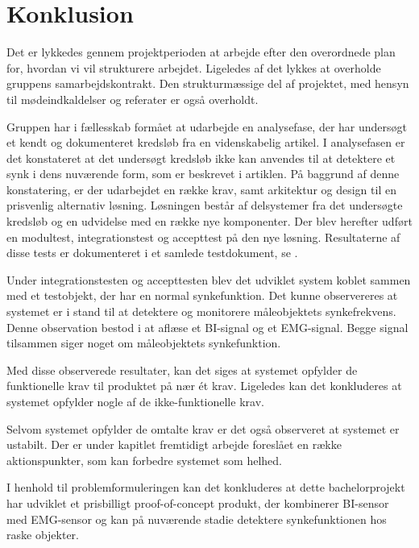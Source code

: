 \chapter{Konklusion}

Det er lykkedes gennem projektperioden at arbejde efter den overordnede plan for, hvordan vi vil strukturere arbejdet.  Ligeledes af det lykkes at overholde gruppens samarbejdskontrakt. Den strukturmæssige del af projektet, med hensyn til mødeindkaldelser og referater er også overholdt. 

Gruppen har i fællesskab formået at udarbejde en analysefase, der har undersøgt et kendt og dokumenteret kredsløb fra en videnskabelig artikel. I analysefasen er det konstateret at det undersøgt kredsløb ikke kan anvendes til at detektere et synk i dens nuværende form, som er beskrevet i artiklen. På baggrund af denne konstatering, er der udarbejdet en række krav, samt arkitektur og design til en prisvenlig alternativ løsning. Løsningen består af delsystemer fra det undersøgte kredsløb og en udvidelse med en række nye komponenter.  Der blev herefter udført en modultest, integrationstest og accepttest på den nye løsning. Resultaterne af disse tests er dokumenteret i et samlede testdokument, se .
 
Under integrationstesten og accepttesten blev det udviklet system koblet sammen med et testobjekt, der har en normal synkefunktion.  Det kunne observereres at systemet er i stand til at detektere og monitorere måleobjektets synkefrekvens.  Denne observation bestod i at aflæse et BI-signal og et EMG-signal. Begge signal tilsammen siger noget om måleobjektets synkefunktion. 

Med disse observerede resultater, kan det siges at systemet opfylder de funktionelle krav til produktet på nær ét krav. Ligeledes kan det konkluderes at systemet opfylder nogle af de ikke-funktionelle krav. 

Selvom systemet opfylder de omtalte krav er det også observeret at systemet er ustabilt. Der er under kapitlet fremtidigt arbejde foreslået en række aktionspunkter, som kan forbedre systemet som helhed.

I henhold til problemformuleringen kan det konkluderes at dette bachelorprojekt har udviklet et prisbilligt proof-of-concept produkt, der kombinerer BI-sensor med EMG-sensor og kan på nuværende stadie detektere synkefunktionen hos raske objekter.  








